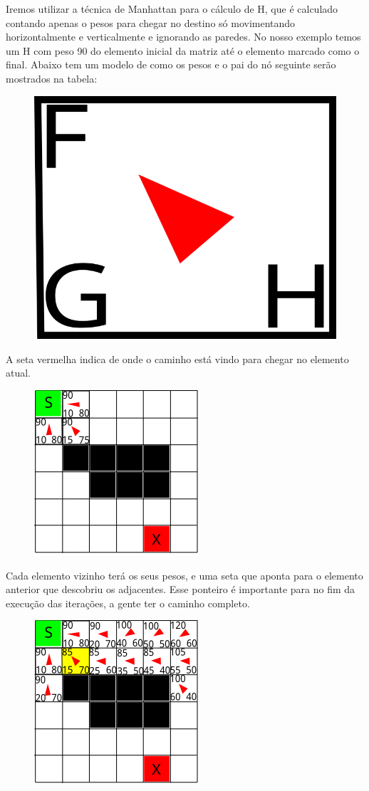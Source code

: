 \documentclass[a4paper, 12pt]{article}
\begin{document}
	Iremos utilizar a técnica de Manhattan para o cálculo de H, que é calculado contando apenas o pesos para chegar no destino só movimentando horizontalmente e verticalmente e ignorando as paredes. No nosso exemplo temos um H com peso 90 do elemento inicial da matriz até o elemento marcado como o final. Abaixo tem um modelo de como os pesos e o pai do nó seguinte serão mostrados na tabela:
		\begin{figure}[H]
			\centering
			\includegraphics[width=0.4\linewidth]{1}
		\end{figure}
	A seta vermelha indica de onde o caminho está vindo para chegar no elemento atual.
		\begin{figure}[H]
			\centering
			\includegraphics[width=0.4\linewidth]{2}
		\end{figure}
	Cada elemento vizinho terá os seus pesos, e uma seta que aponta para o elemento anterior que descobriu os adjacentes. Esse ponteiro é importante para no fim da execução das iterações, a gente ter o caminho completo.
		\begin{figure}[H]
			\centering
			\includegraphics[width=0.4\linewidth]{3}
		\end{figure}
\end{document}
